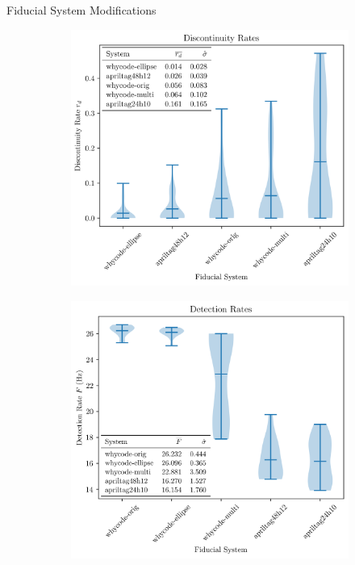\documentclass[final, 20pt]{beamer}
\newlength{\colwidth}
\begin{document}
\begin{frame}[t]
\begin{columns}[t]
\begin{column}{\colwidth}
\begin{block}{Fiducial System Modifications}
\begin{figure}[]
\begin{subfigure}[b]{0.49\linewidth}
            \includegraphics[width=\textwidth]{./images/violin_plot_five_member}
            \label{figure:violin_plot_five_member}
        \end{subfigure}
        \begin{subfigure}[b]{0.49\linewidth}
            \includegraphics[width=\textwidth]{./images/violin_plot_speed_five_member}

\end{subfigure}
\end{figure}
\end{block}
\end{column}
\end{columns}
\end{frame}
\end{document}
